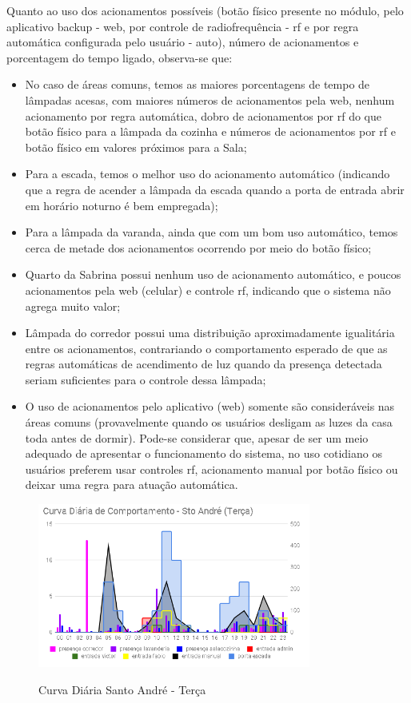 Quanto ao uso dos acionamentos possíveis (botão físico presente no módulo, pelo aplicativo backup - web, por controle de radiofrequência - rf e por regra automática configurada pelo usuário - auto), número de acionamentos e porcentagem do tempo ligado, observa-se que:

\begin{itemize}
	\item No caso de áreas comuns, temos as maiores porcentagens de tempo de lâmpadas acesas, com maiores números de acionamentos pela web, nenhum acionamento por regra automática, dobro de acionamentos por rf do que botão físico para a lâmpada da cozinha e números de acionamentos por rf e botão físico em valores próximos para a Sala;
	\item Para a escada, temos o melhor uso do acionamento automático (indicando que a regra de acender a lâmpada da escada quando a porta de entrada abrir em horário noturno é bem empregada);
	\item Para a lâmpada da varanda, ainda que com um bom uso automático, temos cerca de metade dos acionamentos ocorrendo por meio do botão físico;
	\item Quarto da Sabrina possui nenhum uso de acionamento automático, e poucos acionamentos pela web (celular) e controle rf, indicando que o sistema não agrega muito valor;
	\item Lâmpada do corredor possui uma distribuição aproximadamente igualitária entre os acionamentos, contrariando o comportamento esperado de que as regras automáticas de acendimento de luz quando da presença detectada seriam suficientes para o controle dessa lâmpada;
	\item O uso de acionamentos pelo aplicativo (web) somente são consideráveis nas áreas comuns (provavelmente quando os usuários desligam as luzes da casa toda antes de dormir). Pode-se considerar que, apesar de ser um meio adequado de apresentar o funcionamento do sistema, no uso cotidiano os usuários preferem usar controles rf, acionamento manual por botão físico ou deixar uma regra para atuação automática.
\end{itemize}

\begin{figure}[H]
	\centering
	\caption{Curva Diária Santo André - Terça}
	\includegraphics[width=0.8\textwidth]{diaStoAndreTerca}
	\label{fig:diaStoAndreTerca}
\end{figure}

